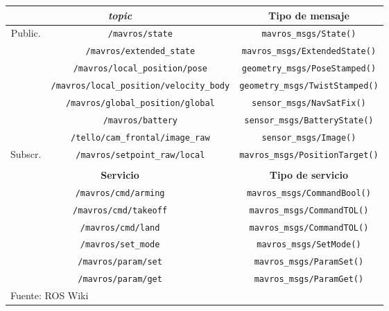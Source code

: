 \documentclass[../main.tex]{subfiles}
\begin{document}
\begin{table}[H]
	{\begin{tabular}{|c|c|c|}
		\hline
		\multicolumn{2}{|c|}{\textbf{\emph{topic}}} & \textbf{Tipo de mensaje} \\
		\hline
		\multirow{6}{*}{Public.} & \lstinline{/mavros/state} & \lstinline{mavros_msgs/State()} \\
		\cline{2-3}
		 & \lstinline{/mavros/extended_state} & \lstinline{mavros_msgs/ExtendedState()} \\
		\cline{2-3}
		 & \lstinline{/mavros/local_position/pose} & \lstinline{geometry_msgs/PoseStamped()} \\
		\cline{2-3}
		 & \lstinline{/mavros/local_position/velocity_body} & \lstinline{geometry_msgs/TwistStamped()} \\
		\cline{2-3}
		 & \lstinline{/mavros/global_position/global} & \lstinline{sensor_msgs/NavSatFix()} \\
		\cline{2-3}
		 & \lstinline{/mavros/battery} & \lstinline{sensor_msgs/BatteryState()} \\
		\cline{2-3}
		 & \lstinline{/tello/cam_frontal/image_raw} & \lstinline{sensor_msgs/Image()} \\
		\hline
		Subscr. & \lstinline{/mavros/setpoint_raw/local} & \lstinline{mavros_msgs/PositionTarget()} \\
		\hline
		\multicolumn{3}{c}{} \\
		\hline
		\multicolumn{2}{|c|}{\textbf{Servicio}} & \textbf{Tipo de servicio} \\
		\hline
		\multicolumn{2}{|c|}{\lstinline{/mavros/cmd/arming}} & \lstinline{mavros_msgs/CommandBool()} \\
		\hline
		\multicolumn{2}{|c|}{\lstinline{/mavros/cmd/takeoff}} & \lstinline{mavros_msgs/CommandTOL()} \\
		\hline
		\multicolumn{2}{|c|}{\lstinline{/mavros/cmd/land}} & \lstinline{mavros_msgs/CommandTOL()} \\
		\hline
		\multicolumn{2}{|c|}{\lstinline{/mavros/set_mode}} & \lstinline{mavros_msgs/SetMode()} \\
		\hline
		\multicolumn{2}{|c|}{\lstinline{/mavros/param/set}} & \lstinline{mavros_msgs/ParamSet()} \\
		\hline
		\multicolumn{2}{|c|}{\lstinline{/mavros/param/get}} & \lstinline{mavros_msgs/ParamGet()} \\
		\hline
		\multicolumn{3}{l}{Fuente: ROS Wiki}
	\end{tabular}}
\end{table}
\end{document}
